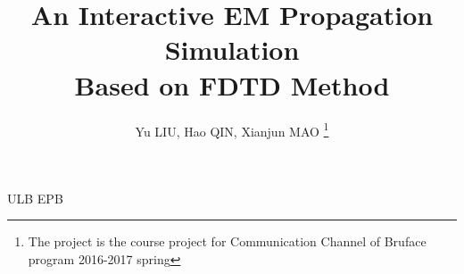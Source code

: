 \documentclass[journal]{IEEEtran}
\begin{document}
%
\title{An Interactive EM Propagation Simulation \\ Based on FDTD Method}
%
%
%

\author{Yu LIU,
        Hao QIN, Xianjun MAO
\thanks{The project is the course project for Communication Channel of Bruface program 2016-2017 spring}}

% 
%



%
{ULB EPB}

\maketitle
\end{document}
